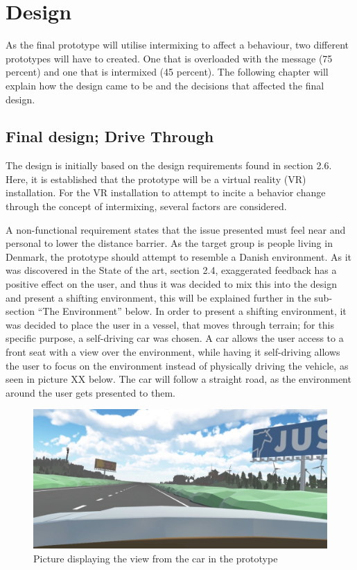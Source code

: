 \chapter{Design}

As the final prototype will utilise intermixing to affect a behaviour, two different prototypes will have to created. One that is overloaded with the message (75 percent) and one that is intermixed (45 percent). The following chapter will explain how the design came to be and the decisions that affected the final design.

\section{Final design; Drive Through}
The design is initially based on the design requirements found in section 2.6. Here, it is established that the prototype will be a virtual reality (VR) installation. For the VR installation to attempt to incite a behavior change through the concept of intermixing, several factors are considered.

A non-functional requirement states that the issue presented must feel near and personal to lower the distance barrier. As the target group is people living in Denmark, the prototype should attempt to resemble a Danish environment. As it was discovered in the State of the art, section 2.4, exaggerated feedback has a positive effect on the user, and thus it was decided to mix this into the design and present a shifting environment, this will be explained further in the sub-section “The Environment” below. In order to present a shifting environment, it was decided to place the user in a vessel, that moves through terrain; for this specific purpose, a self-driving car was chosen.
A car allows the user access to a front seat with a view over the environment, while having it self-driving allows the user to focus on the environment instead of physically driving the vehicle, as seen in picture XX below. The car will follow a straight road, as the environment around the user gets presented to them. 

 \begin{figure}[H]
        	\centering
        	\includegraphics[width=0.9\linewidth]{figure/Design/Designpic1.jpg}
        	\caption{Picture displaying the view from the car in the prototype}
        	\label{fig:designpic1}
        \end{figure}
        
